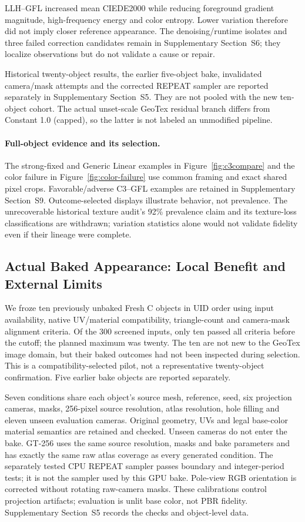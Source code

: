 \documentclass[times,twocolumn,final]{elsarticle}
\begin{document}
LLH--GFL increased mean CIEDE2000 while reducing foreground gradient magnitude, high-frequency energy and color entropy. Lower variation therefore did not imply closer reference appearance. The denoising/runtime isolates and three failed correction candidates remain in Supplementary Section~S6; they localize observations but do not validate a cause or repair.

Historical twenty-object results, the earlier five-object bake, invalidated camera/mask attempts and the corrected REPEAT sampler are reported separately in Supplementary Section~S5. They are not pooled with the new ten-object cohort. The actual unset-scale GeoTex residual branch differs from Constant 1.0 (capped), so the latter is not labeled an unmodified pipeline.

\paragraph{Full-object evidence and its selection.}
The strong-fixed and Generic Linear examples in Figure~\ref{fig:c3compare} and the color failure in Figure~\ref{fig:color-failure} use common framing and exact shared pixel crops. Favorable/adverse C3--GFL examples are retained in Supplementary Section~S9. Outcome-selected displays illustrate behavior, not prevalence. The unrecoverable historical texture audit's 92\% prevalence claim and its texture-loss classifications are withdrawn; variation statistics alone would not validate fidelity even if their lineage were complete.


\subsection{Actual Baked Appearance: Local Benefit and External Limits}
\label{subsec:new-bake}
We froze ten previously unbaked Fresh C objects in UID order using input availability, native UV/material compatibility, triangle-count and camera-mask alignment criteria. Of the 300 screened inputs, only ten passed all criteria before the cutoff; the planned maximum was twenty. The ten are not new to the GeoTex image domain, but their baked outcomes had not been inspected during selection. This is a compatibility-selected pilot, not a representative twenty-object confirmation. Five earlier bake objects are reported separately.

Seven conditions share each object's source mesh, reference, seed, six projection cameras, masks, 256-pixel source resolution, atlas resolution, hole filling and eleven unseen evaluation cameras. Original geometry, UVs and legal base-color material semantics are retained and checked. Unseen cameras do not enter the bake. GT-256 uses the same source resolution, masks and bake parameters and has exactly the same raw atlas coverage as every generated condition. The separately tested CPU REPEAT sampler passes boundary and integer-period tests; it is not the sampler used by this GPU bake. Pole-view RGB orientation is corrected without rotating raw-camera masks. These calibrations control projection artifacts; evaluation is unlit base color, not PBR fidelity. Supplementary Section~S5 records the checks and object-level data.
\end{document}

